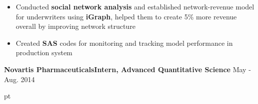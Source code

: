 \documentclass[10.5pt]{res} %
\begin{document}
\begin{resume}
\begin{itemize}
			\item  Conducted \textbf{social network analysis} and established network-revenue model for underwriters using \textbf{iGraph}, helped them to create 5\% more revenue overall by improving network structure 
			\item Created \textbf{SAS} codes for monitoring and tracking model performance in production system
		\end{itemize}\vspace{-\topsep}
	\textbf{Novartis Pharmaceuticals}\quad\quad\quad \textbf{Intern, Advanced Quantitative Science}    \hfill May - Aug. 2014
		\begin{itemize} pt

\end{itemize}
\end{resume}
\end{document}

